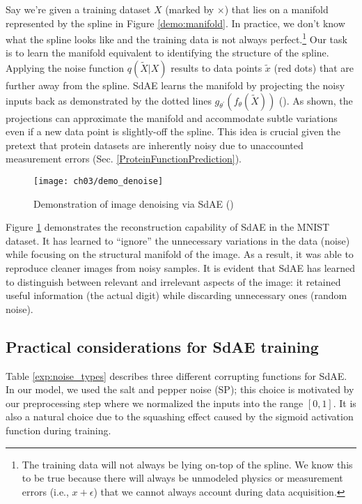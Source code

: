 \par Say we're given a training dataset $X$ (marked by $\times$) that lies on
a manifold represented by the spline in Figure \ref{demo:manifold}. In
practice, we don't know what the spline looks like and the training data is
not always perfect.\footnote{
  The training data will not always be lying on-top of the spline. We know
  this to be true because there will always be unmodeled physics or
  measurement errors (i.e., $x+\epsilon$) that we cannot always account
  during data acquisition.
} Our task is to learn the manifold equivalent to identifying the structure
of the spline. Applying the noise function $q(\widetilde{X}|X)$ results to
data points $\widetilde{x}$ (red dots) that are further away from the spline.
SdAE learns the manifold by projecting the noisy inputs back as demonstrated
by the dotted lines $g_{\theta^{\prime}}(f_{\theta}(\widetilde{X}))$
(\cite{vincent2008denoising}). As shown, the projections can approximate the
manifold and accommodate subtle variations even if a new data point is
slightly-off the spline. This idea is crucial given the pretext that protein
datasets are inherently noisy due to unaccounted measurement errors (Sec.
\ref{ProteinFunctionPrediction}).

\begin{figure}[h]
  \centering
  \texttt{[image: ch03/demo\_denoise]}
  \caption[Demonstration of image denoising via SdAE]{
    Demonstration of image denoising via SdAE (\cite{chollet2016autoencoders})}
  \label{demo:denoise}
\end{figure}

\par Figure \ref{demo:denoise} demonstrates the reconstruction capability of
SdAE in the MNIST dataset. It has learned to ``ignore'' the unnecessary
variations in the data (noise) while focusing on the structural manifold of
the image. As a result, it was able to reproduce cleaner images from noisy
samples. It is evident that SdAE has learned to distinguish between relevant
and irrelevant aspects of the image: it retained useful information (the
actual digit) while discarding unnecessary ones (random noise).

\subsection{Practical considerations for SdAE training}

\par Table \ref{exp:noise_types} describes three different corrupting functions
for SdAE. In our model, we used the salt and pepper noise (SP); this choice is
motivated by our preprocessing step where we normalized the inputs into the
range $\left[0,1\right]$. It is also a natural choice due to the squashing
effect caused by the sigmoid activation function during training. 

